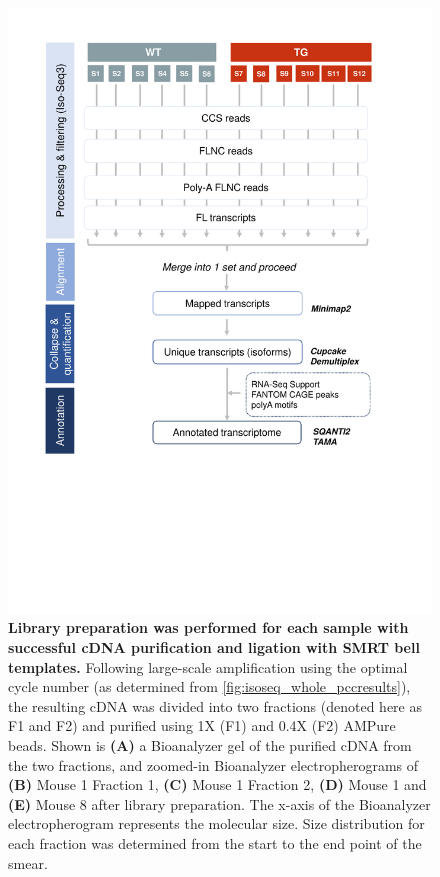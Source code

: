 \begin{figure}[!htp]
	\centering
	\vspace{20pt}
	\includegraphics[page=3,trim={1cm 12cm 0 0cm},clip,scale = 0.8]{Figures/WholeTranscriptome_Figures.pdf}
	\captionsetup{width=0.95\textwidth}
	\caption[Iso-Seq global transcriptome profiling - SMRTbell library preparation]%
	{\textbf{Library preparation was performed for each sample with successful cDNA purification and ligation with SMRT bell templates.} Following large-scale amplification using the optimal cycle number (as determined from \cref{fig:isoseq_whole_pccresults}), the resulting cDNA was divided into two fractions (denoted here as F1 and F2) and purified using 1X (F1) and 0.4X (F2) AMPure beads. Shown is \textbf{(A)} a Bioanalyzer gel of the purified cDNA from the two fractions, and zoomed-in Bioanalyzer electropherograms of \textbf{(B)} Mouse 1 Fraction 1, \textbf{(C)} Mouse 1 Fraction 2, \textbf{(D)} Mouse 1 and \textbf{(E)} Mouse 8 after library preparation. The x-axis of the Bioanalyzer electropherogram represents the molecular size. Size distribution for each fraction was determined from the start to the end point of the smear. 
}
\end{figure}

